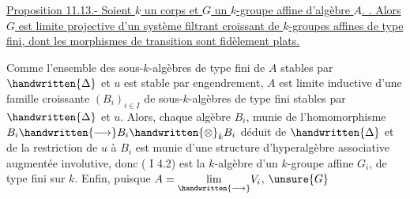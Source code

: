 \uline{Proposition 11.13.-  Soient $k$ un corps et $G$ un $k$-groupe affine d'algèbre $A$. . Alors $G$ est limite projective d'un système filtrant croissant de $k$-groupes affines de type fini, dont les morphismes de transition sont fidèlement plats.}

Comme l'ensemble des sous-$k$-algèbres de type fini de $A$ stables par $\handwritten{\Delta}$ et $u$ est stable par engendrement, $A$ est limite inductive d'une famille  croissante $(B_i)_{i\in I}$ de sous-$k$-algèbres de type fini stables par $\handwritten{\Delta}$ et $u$. Alors, chaque algèbre $B_i$, munie de l'homomorphisme $B_i\handwritten{\longrightarrow}B_i\handwritten{\otimes}_k B_i$ déduit de $\handwritten{\Delta}$ et de la restriction de $u$ à $B_i$ est munie d'une structure d'hyperalgèbre associative augmentée involutive, donc ( I 4.2) est la $k$-algèbre d'un $k$-groupe affine $G_i$, de type fini sur $k$. Enfin, puisque $A=\underset{\handwritten{\longrightarrow}}{\lim}V_i$,
$\unsure{G}$
